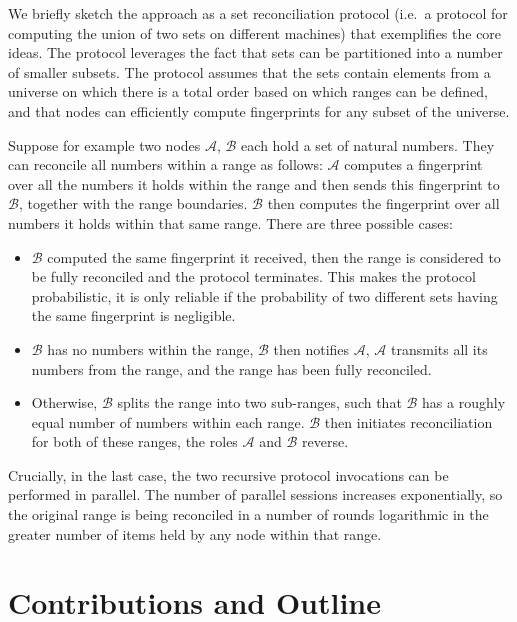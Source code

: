 We briefly sketch the approach as a set reconciliation
protocol (i.e.~a protocol for computing the union of two sets on
different machines) that exemplifies the core ideas. The protocol
leverages the fact that sets can be partitioned into a number of smaller
subsets. The protocol assumes that the sets contain elements from
a universe on which there is a total order based on which ranges can be
defined, and that nodes can efficiently compute fingerprints for any subset of the
universe.

Suppose for example two nodes $\mathcal{A}$, $\mathcal{B}$ each hold a set of natural numbers.
They can reconcile all numbers within a range as follows: $\mathcal{A}$ computes
a fingerprint over all the numbers it holds within the range and then sends this
fingerprint to $\mathcal{B}$, together with the range boundaries. $\mathcal{B}$ then computes
the fingerprint over all numbers it holds within that same range. There
are three possible cases:

\begin{itemize}
\item
  $\mathcal{B}$ computed the same fingerprint it received, then the range is considered to be fully reconciled and the protocol terminates. This makes the protocol probabilistic, it is only reliable if the probability of two different sets having the same fingerprint is negligible.
\item
  $\mathcal{B}$ has no numbers within the range, $\mathcal{B}$ then notifies $\mathcal{A}$, $\mathcal{A}$
  transmits all its numbers from the range, and the range has been
  fully reconciled.
\item
  Otherwise, $\mathcal{B}$ splits the range into two sub-ranges, such that $\mathcal{B}$
  has a roughly equal number of numbers within each range. $\mathcal{B}$ then
  initiates reconciliation for both of these ranges, the roles $\mathcal{A}$ and
  $\mathcal{B}$ reverse.
\end{itemize}

Crucially, in the last case, the two recursive protocol invocations can
be performed in parallel. The number of parallel sessions increases
exponentially, so the original range is being reconciled in a number
of rounds logarithmic in the greater number of items held by any node
within that range.

\section{Contributions and Outline}

